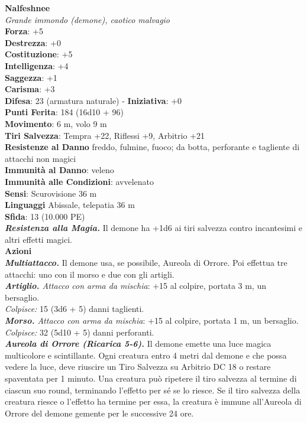 \begin{multicols}{2}
\medskip\textbf{Nalfeshnee}\\
\emph{Grande immondo (demone), caotico malvagio}\\
\textbf{Forza}: +5\\
\textbf{Destrezza}: +0\\
\textbf{Costituzione}: +5\\
\textbf{Intelligenza}: +4\\
\textbf{Saggezza}: +1\\
\textbf{Carisma}: +3\\
\textbf{Difesa}: 23 (armatura naturale) - \textbf{Iniziativa}: +0\\
\textbf{Punti Ferita}: 184 (16d10 + 96)\\
\textbf{Movimento}: 6 m, volo 9 m\\
\textbf{Tiri Salvezza}: Tempra +22, Riflessi +9, Arbitrio +21\\
\textbf{Resistenze al Danno} freddo, fulmine, fuoco; da botta, perforante e tagliente di attacchi non magici\\
\textbf{Immunità al Danno}: veleno\\
\textbf{Immunità alle Condizioni}: avvelenato\\
\textbf{Sensi}: Scurovisione 36 m\\
\textbf{Linguaggi} Abissale, telepatia 36 m \\
\textbf{Sfida}: 13 (10.000 PE)\smallskip\\
\emph{\textbf{Resistenza alla Magia.}} Il demone ha +1d6 ai tiri salvezza contro incantesimi e altri effetti magici.\\
\smallskip\textbf{Azioni}\\
\emph{\textbf{Multiattacco.}} Il demone usa, se possibile, Aureola di Orrore. Poi effettua tre attacchi: uno con il morso e due con gli artigli.\\
\emph{\textbf{Artiglio.} Attacco con arma da mischia}: +15 al colpire, portata 3 m, un bersaglio.\\
\emph{Colpisce:} 15 (3d6 + 5) danni taglienti.\\
\emph{\textbf{Morso.} Attacco con arma da mischia}: +15 al colpire, portata 1 m, un bersaglio.\\
\emph{Colpisce:} 32 (5d10 + 5) danni perforanti.\\
\emph{\textbf{Aureola di Orrore (Ricarica 5-6).}} Il demone emette una luce magica multicolore e scintillante. Ogni creatura entro 4 metri dal demone e che possa vedere la luce, deve riuscire un Tiro Salvezza su Arbitrio DC  18 o restare spaventata per 1 minuto. Una creatura può ripetere il tiro salvezza al termine di ciascun suo round, terminando l'effetto per sé se lo riesce. Se il tiro salvezza della creatura riesce o l'effetto ha termine per essa, la creatura è immune all'Aureola di Orrore del demone gemente per le successive 24 ore.\\

\end{multicols}
